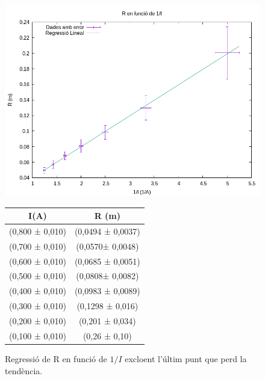 \documentclass[11pt]{article}
\begin{document}
 

\begin{figure}[h]
    \centering
    \begin{minipage}{0.45\textwidth}
        \centering
        \includegraphics[width=\textwidth]{RvsI.png}
        \caption{Regressió de R en funció de $1/I$ excloent l'últim punt que perd la tendència.}
        \label{fig: RvsI}
    \end{minipage}
    \hfill
    \begin{minipage}{0.45\textwidth} 
        \centering
        \begin{tabular}{|c|c|}
            \hline
            I(A)	&	R (m)	\\\hline
            (0,800 ± 0,010)	&	(0,0494 ± 0,0037)	\\\hline
            (0,700 ± 0,010)	&	(0,0570± 0,0048)	\\\hline
            (0,600 ± 0,010)	&	(0,0685 ± 0,0051)	\\\hline
            (0,500 ± 0,010)	&	(0,0808± 0,0082)	\\\hline
            (0,400 ± 0,010)	&	(0,0983 ± 0,0089)	\\\hline
            (0,300 ± 0,010)	&	(0,1298 ± 0,016)	\\\hline
            (0,200 ± 0,010)	&	(0,201 ± 0,034)	\\\hline
            (0,100 ± 0,010)	&	(0,26 ± 0,10)	\\\hline
            
        \end{tabular}
        \label{tab:RvsI}
    \end{minipage}
\end{figure}
\end{document}
